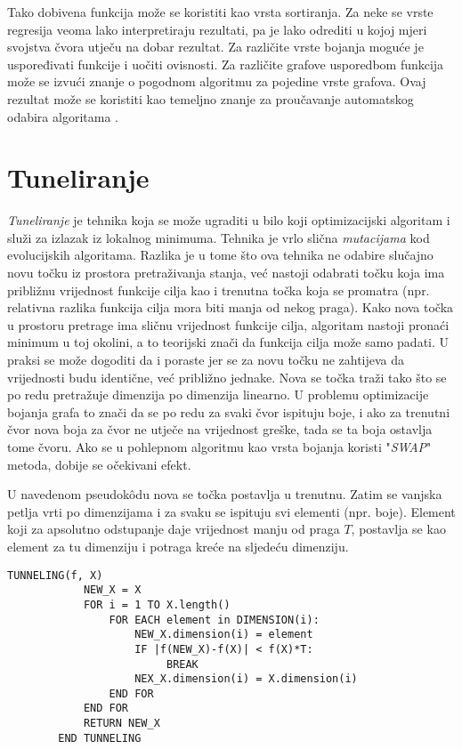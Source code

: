 \documentclass[times, utf8, diplomski, numeric]{fer}
\begin{document}
Tako dobivena funkcija može se koristiti kao vrsta sortiranja. Za neke se vrste regresija veoma lako interpretiraju rezultati, pa je lako odrediti u kojoj mjeri svojstva čvora utječu na dobar rezultat. Za različite vrste bojanja moguće je uspoređivati funkcije i uočiti ovisnosti. Za različite grafove usporedbom funkcija može se izvući znanje o pogodnom algoritmu za pojedine vrste grafova. Ovaj rezultat može se koristiti kao temeljno znanje za proučavanje automatskog odabira algoritama \cite{lit14}.

\section{Tuneliranje}

\emph{Tuneliranje} je tehnika koja se može ugraditi u bilo koji optimizacijski algoritam i služi za izlazak iz lokalnog minimuma. Tehnika je vrlo slična \emph{mutacijama} kod evolucijskih algoritama. Razlika je u tome što ova tehnika ne odabire slučajno novu točku iz prostora pretraživanja stanja, već nastoji odabrati točku koja ima približnu vrijednost funkcije cilja kao i trenutna točka koja se promatra (npr. relativna razlika funkcija cilja mora biti manja od nekog praga). Kako nova točka u prostoru pretrage ima sličnu vrijednost funkcije cilja, algoritam nastoji pronaći minimum u toj okolini, a to teorijski znači da funkcija cilja može samo padati. U praksi se može dogoditi da i poraste jer se za novu točku ne zahtijeva da vrijednosti budu identične, već približno jednake. Nova se točka traži tako što se po redu pretražuje dimenzija po dimenzija linearno. U problemu optimizacije bojanja grafa to znači da se po redu za svaki čvor ispituju boje, i ako za trenutni čvor nova boja za čvor ne utječe na vrijednost greške, tada se ta boja ostavlja tome čvoru. Ako se u pohlepnom algoritmu kao vrsta bojanja koristi "\emph{SWAP}" metoda, dobije se očekivani efekt. 

U navedenom pseudok\^{o}du nova se točka postavlja u trenutnu. Zatim se vanjska petlja vrti po dimenzijama i za svaku se ispituju svi elementi (npr. boje). Element koji za apsolutno odstupanje daje vrijednost manju od praga $T$, postavlja se kao element za tu dimenziju i potraga kreće na sljedeću dimenziju.

\begin{singlespace}
	\begin{lstlisting}[caption=Metoda tuneliranja - implementacija]
		TUNNELING(f, X)
			NEW_X = X
			FOR i = 1 TO X.length()
				FOR EACH element in DIMENSION(i):
					NEW_X.dimension(i) = element
					IF |f(NEW_X)-f(X)| < f(X)*T:
						 BREAK
					NEX_X.dimension(i) = X.dimension(i)
				END FOR
			END FOR
			RETURN NEW_X
		END TUNNELING
	\end{lstlisting}
\end{singlespace}
\end{document}
